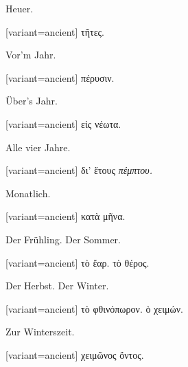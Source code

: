 Heuer.

\switchcolumn

\begin{greek}[variant=ancient]%
τῆτες.

\end{greek}%
\switchcolumn*

Vor'm Jahr.

\switchcolumn

\begin{greek}[variant=ancient]%
πέρυσιν.

\end{greek}%
\switchcolumn*

Über's Jahr.

\switchcolumn

\begin{greek}[variant=ancient]%
εἰς νέωτα.

\end{greek}%
\switchcolumn*

Alle vier Jahre.

\switchcolumn

\begin{greek}[variant=ancient]%
δι' ἔτους \emph{πέμπτου.}

\end{greek}%
\switchcolumn*

Monatlich.

\switchcolumn

\begin{greek}[variant=ancient]%
κατὰ μῆνα.

\end{greek}%
\switchcolumn*

Der Frühling. Der Sommer.

\switchcolumn

\begin{greek}[variant=ancient]%
τὸ ἔαρ. τὸ θέρος.

\end{greek}%
\switchcolumn*

Der Herbst. Der Winter.

\switchcolumn

\begin{greek}[variant=ancient]%
τὸ φθινόπωρον. ὁ χειμών.

\end{greek}%
\switchcolumn*

Zur Winters\textcompwordmark{}zeit.

\switchcolumn

\begin{greek}[variant=ancient]%
χειμῶνος ὄντος.

\end{greek}%
\switchcolumn*

